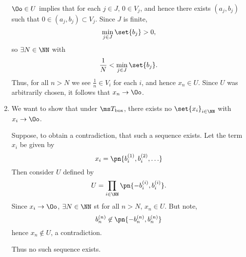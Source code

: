 \documentclass{fkpset}
\newcommand{\tbox}{\ensuremath \ms T_{\rm box}}
\begin{document}
\begin{solution}
\begin{enumerate}[label=(\arabic*)]
        $\Oo \in U$ implies that for each $j \in J$, $0 \in V_j$, and
        hence there exists $(a_j, b_j)$ such that $0 \in (a_j, b_j)
        \subset V_j$. Since $J$ is finite,
        \[
          \min_{j \in J} \set{b_j} > 0,
        \]
        so $\exists N \in \NN$ with
        \[
          \frac{1}{N} < \min_{j \in J}\set{b_j}.
        \]
        Thus, for all $n > N$ we see $\frac{1}{n} \in V_i$ for each
        $i$, and hence $x_n \in U$. Since $U$ was arbitrarily chosen,
        it follows that $x_n \to \Oo$.
      \item We want to show that under $\tbox$, there exists no
        $\set{x_i}_{i \in \NN}$ with $x_i \to \Oo$.

        Suppose, to obtain a contradiction, that such a sequence
        exists. Let the term $x_i$ be given by
        \[
          x_i = \pn{b_{i}^{(1)}, b_{i}^{(2)}, \ldots}
        \]
        Then consider $U$ defined by
        \[
          U = \prod_{i \in \NN} \pn{-b_{i}^{(i)}, b_{i}^{(i)}}.
        \]
        Since $x_i \to \Oo$, $\exists N \in \NN$ st for all $n > N$,
        $x_n \in U$. But note,
        \[
          b_{n}^{(n)} \not \in \pn{-b_{n}^{(n)}, b_{n}^{(n)}}
        \]
        hence $x_n \not \in U$, a contradiction.

        Thus no such sequence exists.
    \end{enumerate}
  \end{solution}
  \clearpage
\end{document}
